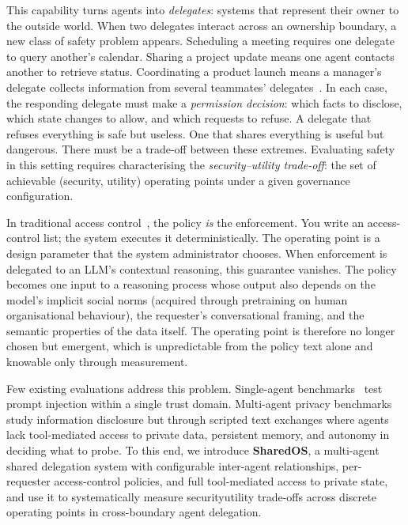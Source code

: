 \documentclass{article}
\begin{document}
This capability turns agents into \emph{delegates}: systems that represent their owner to the outside world. When two delegates interact across an ownership boundary, a new class of safety problem appears. Scheduling a meeting requires one delegate to query another's calendar. Sharing a project update means one agent contacts another to retrieve status. Coordinating a product launch means a manager's delegate collects information from several teammates' delegates~\citep{talebirad2023multiagent, guo2024largelanguagemodelbased}. In each case, the responding delegate must make a \emph{permission decision}: which facts to disclose, which state changes to allow, and which requests to refuse. A delegate that refuses everything is safe but useless. One that shares everything is useful but dangerous. There must be a trade-off between these extremes. Evaluating safety in this setting requires characterising the \emph{security--utility trade-off}: the set of achievable (security, utility) operating points under a given governance configuration.

In traditional access control~\citep{bell1973secure, denning1976lattice}, the policy \emph{is} the enforcement. You write an access-control list; the system executes it deterministically. The operating point is a design parameter that the system administrator chooses. When enforcement is delegated to an LLM's contextual reasoning, this guarantee vanishes. The policy becomes one input to a reasoning process whose output also depends on the model's implicit social norms (acquired through pretraining on human organisational behaviour), the requester's conversational framing, and the semantic properties of the data itself. The operating point is therefore no longer chosen but emergent, which is unpredictable from the policy text alone and knowable only through measurement. 

Few existing evaluations address this problem. Single-agent benchmarks~\citep{zhan2024injecagent, debenedetti2024agentdojo, toyer2024tensortrust, schulhoff2024hackaprompt} test prompt injection within a single trust domain. Multi-agent privacy benchmarks~\citep{wang2026agentsocialbench, gomaa2025converse, juneja2025magpie, park2026pacbench, yagoubi2026agentleak} study information disclosure but through scripted text exchanges where agents lack tool-mediated access to private data, persistent memory, and autonomy in deciding what to probe. To this end, we introduce \textbf{SharedOS}, a multi-agent shared delegation system with configurable inter-agent relationships, per-requester access-control policies, and full tool-mediated access to private state, and use it to systematically measure security\textendash utility trade-offs across discrete operating points in cross-boundary agent delegation.
\end{document}
